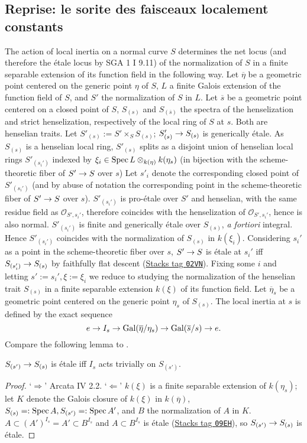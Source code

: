 \documentclass[deligne.tex]{subfiles}
\begin{document}
\subsection*{Reprise: le sorite des faisceaux localement constants}\label{laumon:reprise}
	The action of local inertia on a normal curve $S$ determines the net
	locus (and therefore the étale locus by SGA 1 I 9.11) of the 
	normalization of $S$ in a finite separable extension of its function 
	field in the following way.
	Let $\overline\eta$ be a geometric point centered on the generic point
	$\eta$ of $S$, $L$ a finite Galois extension of the function field of
	$S$, and $S'$ the normalization of $S$ in $L$.
	Let $\overline s$ be a geometric point centered on a closed point of $S$,
	$S_{(s)}$ and $S_{(\overline s)}$ the spectra of the henselization and
	strict henselization, respectively of the local ring of $S$ at $s$.
	Both are henselian traits.
	Let $S'_{(s)}:=S'\times_SS_{(s)}$; $S'_{(s)}\rightarrow S_{(s)}$ is generically
	étale.
	As $S_{(s)}$ is a henselian local ring, $S'_{(s)}$ splits as a disjoint
	union of henselian local rings $S'_{(s_i')}$ indexed by
	$\xi_i\in\operatorname{Spec} L\otimes_{k(\eta)}k(\eta_s)$ (in bijection with the
	scheme-theoretic fiber of $S'\rightarrow S$ over $s$)
	Let $s'_i$ denote the corresponding closed point of $S'_{(s_i')}$
	(and by abuse of notation the corresponding point in the scheme-theoretic
	fiber of $S'\rightarrow S$ over $s$).
	$S'_{(s_i')}$ is pro-étale over $S'$ and henselian, with the same residue
	field as $\mathscr O_{S',s_i'}$, therefore coincides with the
	henselization of $\mathscr O_{S',s_i'}$, hence is also normal.
	$S'_{(s_i')}$ is finite and generically étale over $S_{(s)}$,
	\emph{a fortiori} integral. Hence $S'_{(s_i')}$ coincides with the
	normalization of $S_{(s)}$ in $k(\xi_i)$.
	Considering $s_i'$ as a point in the scheme-theoretic fiber over $s$,
	$S'\rightarrow S$ is étale at $s_i'$ iff $S_{(s_i')}\rightarrow S_{(s)}$ by faithfully
	flat descent
	(\href{https://stacks.math.columbia.edu/tag/02VN}{Stacks tag \texttt{02VN}}).
	Fixing some $i$ and letting $s':=s_i',\xi:=\xi_i$ we reduce to studying
	the normalization of the henselian trait $S_{(s)}$ in a finite separable
	extension $k(\xi)$ of its function field.
	Let $\overline\eta_s$ be a geometric point centered on the generic
	point $\eta_s$ of $S_{(s)}$.
	The local inertia at $s$ is defined by the exact sequence
	\begin{equation*}
		e\rightarrow I_{s}\rightarrow\operatorname{Gal}(\overline\eta/\eta_s)\rightarrow\operatorname{Gal}(\overline s/s)\rightarrow e.
	\end{equation*}
	Compare the following lemma to \cite[Exp.\,V \S2]{SGA1}.
	\begin{lemma*}
		$S_{(s')}\rightarrow S_{(s)}$ is étale iff $I_s$ acts trivially on $S_{(s')}$.
	\end{lemma*}
	\begin{proof}
	`$\Rightarrow$' Arcata IV 2.2.
	`$\Leftarrow$' $k(\xi)$ is a finite separable extension of $k(\eta_s)$;
	let $K$ denote the Galois closure of $k(\xi)$ in $k(\overline\eta)$,
	$S_{(s)}=:\operatorname{Spec} A,S_{(s')}=:\operatorname{Spec} A'$, and $B$ the normalization of $A$ 
	in $K$. $A\subset (A')^{I_s}=A'\subset B^{I_s}$ and $A\subset B^{I_s}$ is
	étale (\href{https://stacks.math.columbia.edu/tag/09EH}{Stacks tag \texttt{09EH}}),
	so $S_{(s')}\rightarrow S_{(s)}$ is étale.
	\end{proof}
\end{document}
